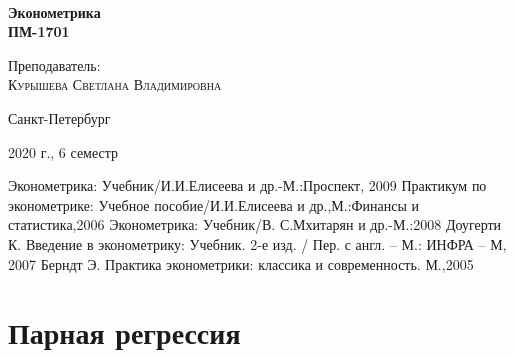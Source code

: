 \documentclass[aps,%
12pt,%
final,%
oneside,
onecolumn,%
musixtex, %
superscriptaddress,%
centertags]{article} %
\begin{document}
\begin{titlepage} 
\begin{center}
 
\textbf{}\\[10.0cm]
\textbf{\LARGE Эконометрика}\\[0.5cm]
\textbf{\Large ПМ-1701} \\[0.1cm]

\begin{center} \large
{Преподаватель:} \\[0.5cm]
\textsc {Курышева Светлана Владимировна }\\
\end{center}
\vfill 

{\large {Санкт-Петербург}} \par
{\large {2020 г., 6 семестр}}
\end{center} 
\end{titlepage}

\begin{thebibliography}{3}
Эконометрика: Учебник/И.И.Елисеева и др.-М.:Проспект, 2009
Практикум по эконометрике: Учебное пособие/И.И.Елисеева и др.,М.:Финансы и статистика,2006 
Эконометрика: Учебник/В. С.Мхитарян и др.-М.:2008
Доугерти К. Введение в эконометрику: Учебник. 2-е изд. / Пер. с англ. – М.: ИНФРА – М, 2007
Берндт Э. Практика эконометрики: классика и современность. М.,2005
\end{thebibliography}
\tableofcontents
\newpage
\section{Парная регрессия}
\end{document}
